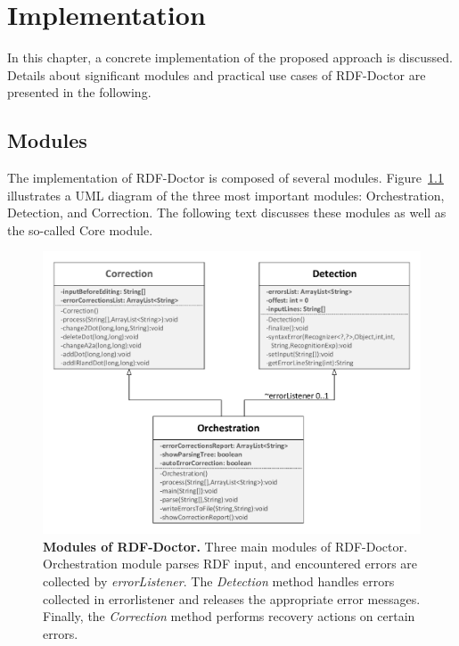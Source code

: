 \chapter{Implementation}
\label{ch:implementation}


In this chapter, a concrete implementation of the proposed approach is discussed. 
Details about significant modules and practical use cases of RDF-Doctor  are presented in the following.  
 
\section {Modules} 

The implementation of RDF-Doctor is composed of several modules.
{Figure~\ref{Fig:UML}} illustrates a UML diagram of the three most important modules: Orchestration, Detection, and Correction. 
The following text discusses these modules as well as the so-called Core module.
	\begin{figure}[ht]
	\begin{center}
		\includegraphics[scale=0.65,angle=0]{images/methods.pdf}
		\caption{\textbf{Modules of RDF-Doctor.} 
		Three main modules of RDF-Doctor. Orchestration module parses RDF input, and encountered errors are collected by \emph{errorListener}.
		The \emph{Detection} method handles errors collected in errorlistener and releases the appropriate error messages.
		Finally, the \emph{Correction} method performs recovery actions on certain errors.}
		\label{Fig:UML}
	\end{center}
\end{figure}


